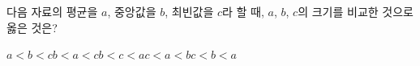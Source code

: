 다음 자료의 평균을 $a$, 중앙값을 $b$, 최빈값을 $c$라 할 때, $a$, $b$, $c$의 크기를 비교한 것으로 옳은 것은?
\begin{choices32}{$a<b<c$}{$b<a<c$}{$b<c<a$}{$c<a<b$}{$c<b<a$}\end{choices32}
